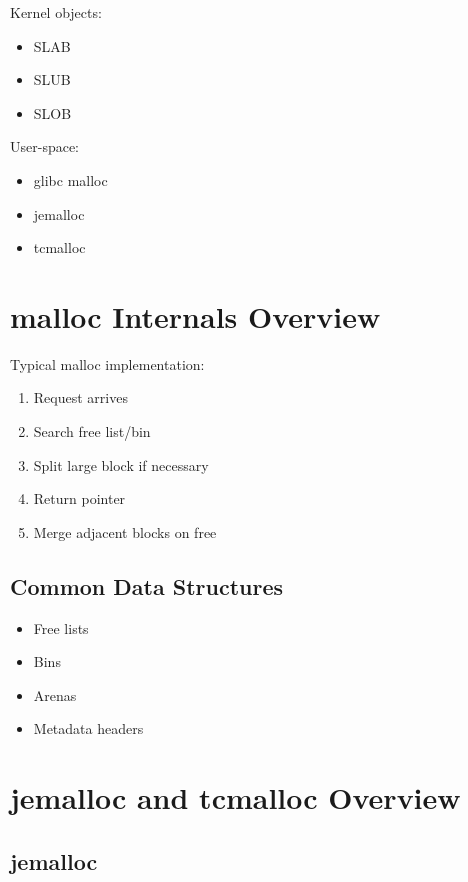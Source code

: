 Kernel objects:

\begin{itemize}
\item SLAB
\item SLUB
\item SLOB
\end{itemize}

User-space:

\begin{itemize}
\item glibc malloc
\item jemalloc
\item tcmalloc
\end{itemize}

\section{malloc Internals Overview}

Typical malloc implementation:

\begin{enumerate}
\item Request arrives
\item Search free list/bin
\item Split large block if necessary
\item Return pointer
\item Merge adjacent blocks on free
\end{enumerate}

\subsection{Common Data Structures}

\begin{itemize}
\item Free lists
\item Bins
\item Arenas
\item Metadata headers
\end{itemize}

\section{jemalloc and tcmalloc Overview}

\subsection{jemalloc}

